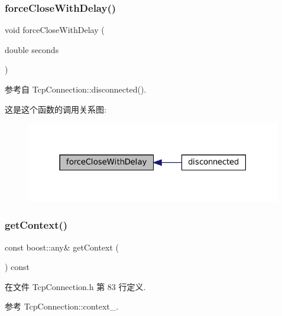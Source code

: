 \subsubsection{\texorpdfstring{force\+Close\+With\+Delay()}{forceCloseWithDelay()}}
{\footnotesize\ttfamily void force\+Close\+With\+Delay (\begin{DoxyParamCaption}\item[{double}]{seconds }\end{DoxyParamCaption})}



参考自 Tcp\+Connection\+::disconnected().

这是这个函数的调用关系图\+:
\nopagebreak
\begin{figure}[H]
\begin{center}
\leavevmode
\includegraphics[width=316pt]{classmuduo_1_1net_1_1TcpConnection_a1400e984896abdc7b716ebaa8a6ea694_icgraph}
\end{center}
\end{figure}
\mbox{\label{classmuduo_1_1net_1_1TcpConnection_aa6a547152bf0e64f8e18dc7146094e1f}} 
\subsubsection{\texorpdfstring{get\+Context()}{getContext()}}
{\footnotesize\ttfamily const boost\+::any\& get\+Context (\begin{DoxyParamCaption}{ }\end{DoxyParamCaption}) const\hspace{0.3cm}{\ttfamily [inline]}}



在文件 Tcp\+Connection.\+h 第 83 行定义.



参考 Tcp\+Connection\+::context\+\_\+.

\mbox{\label{classmuduo_1_1net_1_1TcpConnection_aef1cbfe0592e8196e6c81b4db82a39ce}} 
